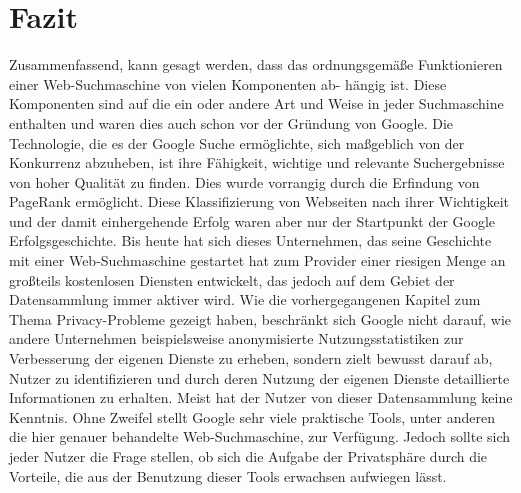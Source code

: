\documentclass[12pt, a4paper]{llncs}
\begin{document}
	\section{Fazit}
	Zusammenfassend, kann gesagt werden, dass das ordnungsgemäße Funktionieren einer Web-Suchmaschine von vielen Komponenten ab- hängig ist. Diese Komponenten
	sind auf die ein oder andere Art und Weise in jeder Suchmaschine enthalten und waren dies auch schon vor der Gründung von Google. Die Technologie, die es
	der Google Suche ermöglichte, sich maßgeblich von der Konkurrenz abzuheben, ist ihre Fähigkeit, wichtige und relevante Suchergebnisse von hoher Qualität zu 
	finden. Dies wurde vorrangig durch die Erfindung von PageRank ermöglicht. Diese Klassifizierung von Webseiten nach ihrer Wichtigkeit und der damit einhergehende
	Erfolg waren aber nur der Startpunkt der Google Erfolgsgeschichte. Bis heute hat sich dieses Unternehmen, das seine Geschichte mit einer Web-Suchmaschine gestartet
	hat zum Provider einer riesigen Menge an großteils kostenlosen Diensten entwickelt, das jedoch auf dem Gebiet der Datensammlung immer aktiver wird. Wie die vorhergegangenen
	Kapitel zum Thema Privacy-Probleme gezeigt haben, beschränkt sich Google nicht darauf, wie andere Unternehmen beispielsweise anonymisierte Nutzungsstatistiken zur 
	Verbesserung der eigenen Dienste zu erheben, sondern zielt bewusst darauf ab, Nutzer zu identifizieren und durch deren Nutzung der eigenen Dienste detaillierte
	Informationen zu erhalten. Meist hat der Nutzer von dieser Datensammlung keine Kenntnis.
	Ohne Zweifel stellt Google sehr viele praktische Tools, unter anderen die hier genauer behandelte Web-Suchmaschine, zur Verfügung. Jedoch sollte sich jeder Nutzer die
	Frage stellen, ob sich die Aufgabe der Privatsphäre durch die Vorteile, die aus der Benutzung dieser Tools erwachsen aufwiegen lässt.
		
	\printbibliography[title={Bibliographie}]
	
\end{document}
